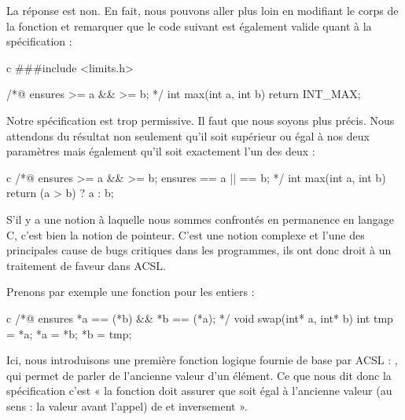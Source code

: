 \documentclass[middle]{zmdocument}
\begin{document}
La réponse est non. En fait, nous pouvons aller plus loin en modifiant le corps 
de la fonction  et remarquer que le code suivant est également valide 
quant à la spécification :



\begin{CodeBlock}{c}
###include <limits.h>

/*@
  ensures \result >= a && \result >= b;
*/
int max(int a, int b){
  return INT_MAX;
}
\end{CodeBlock}



Notre spécification est trop permissive. Il faut que nous soyons plus précis.
Nous attendons du résultat non seulement qu'il soit supérieur ou égal à nos 
deux paramètres mais également qu'il soit exactement l'un des deux :



\begin{CodeBlock}{c}
/*@
  ensures \result >= a && \result >= b;
  ensures \result == a || \result == b;
*/
int max(int a, int b){
  return (a > b) ? a : b;
}
\end{CodeBlock}





S'il y a une notion à laquelle nous sommes confrontés en permanence en 
langage C, c'est bien la notion de pointeur. C'est une notion complexe et 
l'une des principales cause de bugs critiques dans les programmes, ils ont 
donc droit à un traitement de faveur dans ACSL.



Prenons par exemple une fonction  pour les entiers :



\begin{CodeBlock}{c}
/*@
  ensures *a == \old(*b) && *b == \old(*a);
*/
void swap(int* a, int* b){
  int tmp = *a;
  *a = *b;
  *b = tmp;
}
\end{CodeBlock}





Ici, nous introduisons une première fonction logique fournie de base par 
ACSL : , qui permet de parler de l'ancienne valeur d'un élément. 
Ce que nous dit donc la spécification c'est « la fonction doit assurer que
 soit égal à l'ancienne valeur (au sens : la valeur avant l'appel) de 
et inversement ».
\end{document}
